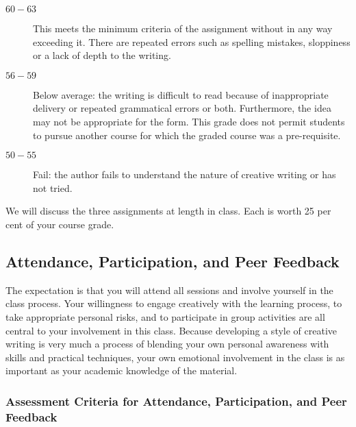 \documentclass[letterpaper,10pt,headsepline]{scrreprt}
\begin{document}
\begin{description}
\item[$60-63$] This meets the minimum criteria of the assignment
  without in any way exceeding it. There are repeated errors such as
  spelling mistakes, sloppiness or a lack of depth to the writing.


\item[$56-59$] Below average: the writing is difficult to read because
  of inappropriate delivery or repeated grammatical errors or both.
  Furthermore, the idea may not be appropriate for the form. This
  grade does not permit students to pursue another course for which
  the graded course was a pre-requisite.

\item[$50-55$] Fail: the author fails to understand the nature of
  creative writing or has not tried.

\end{description}


We will discuss the three assignments at length in class. Each is
worth 25 per cent of your course grade.

\subsection{Attendance, Participation, and Peer Feedback}
The expectation is that you will attend all sessions and involve
yourself in the class process. Your willingness to engage creatively
with the learning process, to take appropriate personal risks, and to
participate in group activities are all central to your involvement in
this class. Because developing a style of creative writing is very
much a process of blending your own personal awareness with skills and
practical techniques, your own emotional involvement in the class is
as important as your academic knowledge of the material.

\subsubsection{Assessment Criteria for Attendance, Participation, and
  Peer Feedback}
\end{document}
